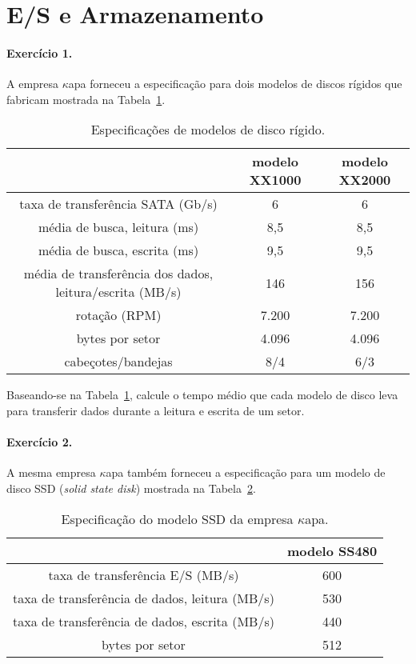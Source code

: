 \section{E/S e Armazenamento}

\paragraph{Exercício 1.} A empresa $\kappa$apa forneceu a especificação para dois modelos
de discos rígidos que fabricam mostrada na Tabela~\ref{tab:hd}.

\begin{table}[ht]
  \centering
  \begin{tabular}[ht]{c|c|c}\hline
    &\bf modelo XX1000 &\bf modelo XX2000 \\\hline
    taxa de transferência SATA (Gb/s) & 6 &  6\\
    média de busca, leitura (ms) & 8,5 & 8,5 \\
    média de busca, escrita (ms) & 9,5 & 9,5  \\
    média de transferência dos dados, leitura/escrita (MB/s)& 146 & 156  \\
    rotação (RPM) & 7.200 & 7.200 \\
    bytes por setor & 4.096 & 4.096 \\
    cabeçotes/bandejas & 8/4 & 6/3 \\\hline
  \end{tabular}
  \caption{Especificações de modelos de disco rígido.}
  \label{tab:hd}
\end{table}

\noindent Baseando-se na Tabela~\ref{tab:hd}, calcule o tempo médio
que cada modelo de disco leva para transferir dados durante a leitura
e escrita de um setor.

\paragraph{Exercício 2.} A mesma empresa $\kappa$apa também forneceu a
especificação para um modelo de disco SSD (\emph{solid state disk})
mostrada na Tabela~\ref{tab:ssd}.

\begin{table}[ht]
  \centering
  \begin{tabular}[ht]{c|c}\hline
    &\bf modelo SS480 \\\hline
    taxa de transferência E/S (MB/s) & 600 \\
    taxa de transferência de dados, leitura (MB/s) & 530  \\
    taxa de transferência de dados, escrita (MB/s) & 440   \\
    bytes por setor & 512  \\\hline
  \end{tabular}
  \caption{Especificação do modelo SSD da empresa $\kappa$apa.}
  \label{tab:ssd}
\end{table}

